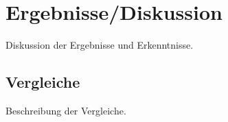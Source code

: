 \chapter{Ergebnisse/Diskussion}
Diskussion der Ergebnisse und Erkenntnisse. 

\section{Vergleiche}
Beschreibung der Vergleiche. 

